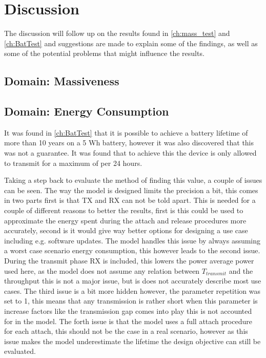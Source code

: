 \chapter{Discussion}
The discussion will follow up on the results found in \autoref{ch:mass_test} and \autoref{ch:BatTest} and suggestions are made to explain some of the findings, as well as some of the potential problems that might influence the results. 

\section{Domain: Massiveness}


\section{Domain: Energy Consumption}
It was found in \autoref{ch:BatTest} that it is possible to achieve a battery lifetime of more than 10 years on a 5 Wh battery, however it was also discovered that this was not a guarantee. It was found that to achieve this the device is only allowed to transmit for a maximum of  per 24 hours. 

Taking a step back to evaluate the method of finding this value, a couple of issues can be seen. The way the model is designed limits the precision a bit, this comes in two parts first is that TX and RX can not be told apart. This is needed for a couple of different reasons to better the results, first is this could be used to approximate the energy spent during the attach and release procedures more accurately, second is it would give way better options for designing a use case including e.g. software updates. The model handles this issue by always assuming a worst case scenario energy consumption, this however leads to the second issue. During the transmit phase RX is included, this lowers the power average power used here, as the model does not assume any relation between $T_{transmit}$ and the throughput this is not a major issue, but is does not accurately describe most use cases. The third issue is a bit more hidden however, the parameter repetition was set to 1, this means that any transmission is rather short when this parameter is increase factors like the transmission gap comes into play this is not accounted for in the model. The forth issue is that the model uses a full attach procedure for each attach, this should not be the case in a real scenario, however as this issue makes the model underestimate the lifetime the design objective can still be evaluated.


